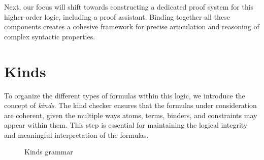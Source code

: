 \documentclass[english, mgr]{iithesis}
\renewcommand{\it}[1]{\textit{#1}}
\begin{document}
Next, our focus will shift towards constructing a dedicated proof system for this higher-order logic, including a proof assistant.
Binding together all these components creates a cohesive framework
for precise articulation and reasoning of complex syntactic properties.


\section{Kinds}
To organize the different types of formulas within this logic, we introduce the concept of \it{kinds}.
The kind checker ensures that the formulas under consideration are coherent, given the multiple ways atoms, terms, binders, and constraints may appear within them. This step is essential for maintaining the logical integrity and meaningful interpretation of the formulas.
\begin{figure}[htbp]
  \caption{Kinds grammar}
  \label{fig:kinds-grammar}
\end{figure}
\end{document}
